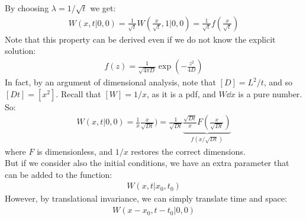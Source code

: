 \documentclass[../template.tex]{subfiles}
\begin{document}
By choosing $\lambda= 1/ \sqrt{t}$ we get:
\begin{align*}
    W(x,t|0,0) = \frac{1}{\sqrt{t}} W\left(\frac{x}{\sqrt{t}}, 1|0,0 \right) = \frac{1}{\sqrt{t}} f\left(\frac{x}{\sqrt{t}} \right) 
\end{align*}   
Note that this property can be derived even if we do not know the explicit solution:
\begin{align*}
    f(z) = \frac{1}{\sqrt{4 \pi D}} \exp\left(-\frac{z^2}{4D} \right) 
\end{align*}
In fact, by an argument of dimensional analysis, note that $[D] = L^2/t$, and so $[Dt] = [x^2]$. Recall that $[W] = 1/x$, as it is a pdf, and $W\dd{x}$ is a pure number. So:
\begin{align*}
    W(x,t|0,0) = \frac{1}{x} \frac{x}{\sqrt{D t}} ) = \frac{1}{\sqrt{Dt}} \underbrace{\frac{\sqrt{Dt}}{x} F \left(\frac{x}{\sqrt{Dt}} \right)}_{f(x/\sqrt{Dt})}  
\end{align*}  
where $F$ is dimensionless, and $1/x$ restores the correct dimensions.\\
But if we consider also the initial conditions, we have an extra parameter that can be added to the function:
\begin{align*}
    W(x,t|x_0, t_0)
\end{align*}
However, by translational invariance, we can simply translate time and space:
\begin{align*}
    W(x-x_0, t-t_0 | 0,0)
\end{align*}
\end{document}
